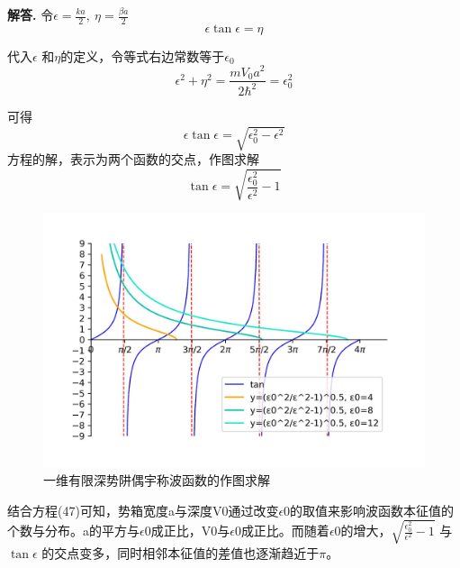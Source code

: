 \documentclass[12pt, a4paper, oneside]{ctexart}
\newenvironment{solution}{\par\noindent\textbf{解答. }}{\\\par}
\begin{document}
\begin{solution}
        令$ \epsilon = \frac{ka}2, \ \eta = \frac{\beta a}2 $
            \begin{equation}
                \epsilon \tan \epsilon = \eta
            \end{equation}
        
        代入$\epsilon$ 和$\eta $的定义，令等式右边常数等于$\epsilon_0$
            \begin{equation}
                \epsilon^2+\eta^2 = \frac{mV_0a^2}{2\hbar^2} = \epsilon_0^2
            \end{equation}

        可得
            \begin{equation}
                \epsilon \tan \epsilon = \sqrt{\epsilon_0^2-\epsilon^2}
            \end{equation}  
        方程的解，表示为两个函数的交点，作图求解
            \begin{equation}
                \tan \epsilon = \sqrt{\frac{\epsilon_0^2}{\epsilon^2}-1}
            \end{equation}

            \begin{figure}[h]
                \centering
                \includegraphics{Solution1.jpg}
                \caption{一维有限深势阱偶宇称波函数的作图求解}
            \end{figure}

        结合方程(47)可知，势箱宽度a与深度V0通过改变$\epsilon0$的取值来影响波函数本征值的个数与分布。a的平方与$\epsilon0$成正比，V0与$\epsilon0$成正比。而随着$\epsilon0$的增大，$ \sqrt{\frac{\epsilon_0^2}{\epsilon^2}-1}$ 与 $ \tan \epsilon$ 的交点变多，同时相邻本征值的差值也逐渐趋近于$\pi$。
        

\end{solution}
\end{document}
